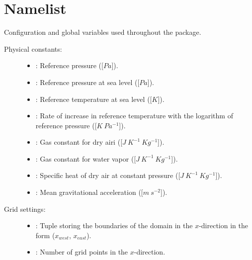 \documentclass[letterpaper,10pt,english]{sphinxmanual}
\begin{document}
\section{Namelist}
\label{\detokenize{api:namelist}}\label{\detokenize{api:module-namelist}}
Configuration and global variables used throughout the package.
\begin{description}
\item[{Physical constants:}] \leavevmode\begin{itemize}
\item {} 
: Reference pressure ({[}\(Pa\){]}).

\item {} 
: Reference pressure at sea level ({[}\(Pa\){]}).

\item {} 
: Reference temperature at sea level ({[}\(K\){]}).

\item {} 
: Rate of increase in reference temperature with the logarithm           of reference pressure ({[}\(K ~ Pa^{-1}\){]}).

\item {} 
: Gas constant for dry airi ({[}\(J ~ K^{-1} ~ Kg^{-1}\){]}).

\item {} 
: Gas constant for water vapor ({[}\(J ~ K^{-1} ~ Kg^{-1}\){]}).

\item {} 
: Specific heat of dry air at constant pressure ({[}\(J ~ K^{-1} ~ Kg^{-1}\){]}).

\item {} 
: Mean gravitational acceleration ({[}\(m ~ s^{-2}\){]}).

\end{itemize}

\item[{Grid settings:}] \leavevmode\begin{itemize}
\item {} 
: Tuple storing the boundaries of the domain in the \(x\)-direction              in the form (\(x_{west}\), \(x_{east}\)).

\item {} 
: Number of grid points in the \(x\)-direction.


\end{itemize}
\end{description}
\end{document}
